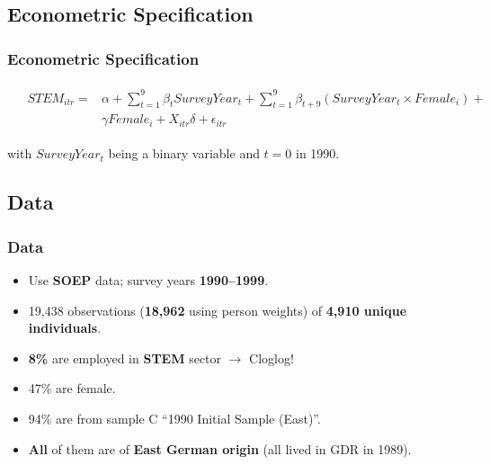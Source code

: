 \documentclass[11pt, aspectratio=1610, xcolor={dvipsnames}]{beamer}
\newcommand{\highlight}[1]{\textbf{\textcolor{PineGreen}{#1}}}
\begin{document}
	\subsection{Econometric Specification}
	\begin{frame}
		\frametitle{Econometric Specification}
		
			{\linespread{1}\normalsize
				\begin{align}
					&\begin{aligned}
						\label{eq:spec}
						STEM_{itr} = & \alpha + \sum_{t=1}^{9}\beta_{t} SurveyYear_{t} + \sum_{t=1}^{9}\beta_{t + 9} (SurveyYear_{t} \times Female_{i}) +\\
						& \gamma Female_{i} + X_{itr} \delta + \epsilon_{itr}
					\end{aligned}
				\end{align}
			}
		
		\vspace{1cm}
		
		with $SurveyYear_{t}$ being a binary variable and $t = 0$ in 1990.
		
	\end{frame}
	
	\subsection{Data}
	\begin{frame}
		\frametitle{Data}
		
		\begin{itemize}
			\item Use \highlight{SOEP} data; survey years \highlight{1990--1999}.
			\item 19,438 observations (\highlight{18,962} using person weights) of \highlight{4,910 unique individuals}.
			\item \highlight{8\%} are employed in \highlight{STEM} sector $\longrightarrow$ Cloglog! %
			\item 47\% are female.
			\item 94\% are from sample C ``1990 Initial Sample (East)''.
			\item \highlight{All} of them are of \highlight{East German origin} (all lived in GDR in 1989).
		\end{itemize}
		
	\end{frame}
	
\end{document}
